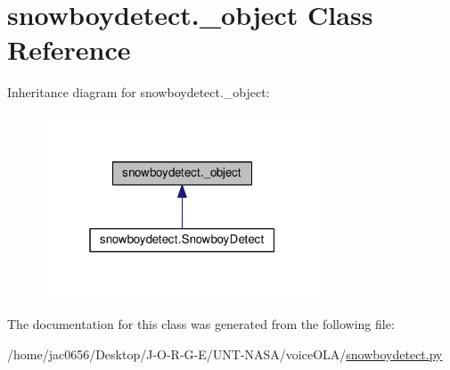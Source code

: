 \hypertarget{classsnowboydetect_1_1__object}{}\section{snowboydetect.\+\_\+object Class Reference}
\label{classsnowboydetect_1_1__object}


Inheritance diagram for snowboydetect.\+\_\+object\+:
\nopagebreak
\begin{figure}[H]
\begin{center}
\leavevmode
\includegraphics[width=235pt]{classsnowboydetect_1_1__object__inherit__graph}
\end{center}
\end{figure}


The documentation for this class was generated from the following file\+:\begin{DoxyCompactItemize}
\item 
/home/jac0656/\+Desktop/\+J-\/\+O-\/\+R-\/\+G-\/\+E/\+U\+N\+T-\/\+N\+A\+S\+A/voice\+O\+L\+A/\hyperlink{snowboydetect_8py}{snowboydetect.\+py}\end{DoxyCompactItemize}
